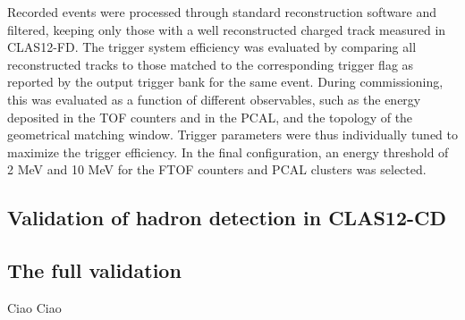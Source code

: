 Recorded events were processed through standard reconstruction software and filtered, keeping only those with a well reconstructed charged track measured in CLAS12-FD. The trigger system efficiency was evaluated by comparing all reconstructed tracks to those matched to the corresponding trigger flag as reported by the output trigger bank for the same event. During commissioning, this was evaluated as a function of different observables, such as the energy deposited in the TOF counters and in the PCAL, and the topology of the geometrical matching window. Trigger parameters were thus individually tuned to maximize the trigger efficiency. In the final configuration, an energy threshold of 2 MeV and 10 MeV for the FTOF counters and PCAL clusters was selected.



\subsection{Validation of hadron detection in CLAS12-CD}

\subsection{The full validation}

Ciao Ciao